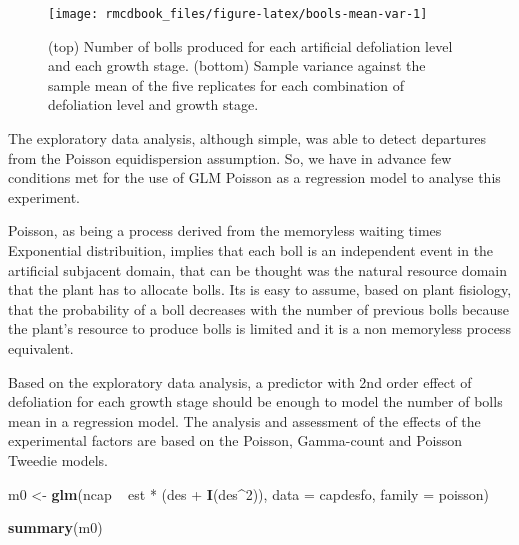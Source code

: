 \documentclass[9pt,a5paper,]{book}
\newenvironment{Shaded}{}{}
\newcommand{\KeywordTok}[1]{\textbf{{#1}}}
\newcommand{\DataTypeTok}[1]{\underline{{#1}}}
\newcommand{\DecValTok}[1]{{#1}}
\newcommand{\StringTok}[1]{{#1}}
\newcommand{\NormalTok}[1]{{#1}}
\renewenvironment{Shaded}{\color{inputcolor}}{}
\renewcommand{\DataTypeTok}[1]{{#1}}
\theoremstyle{definition}
\theoremstyle{definition}
\theoremstyle{remark}
\begin{document}
\begin{figure}[h]

{\centering \texttt{[image: rmcdbook\_files/figure-latex/bools-mean-var-1]} 

}

\caption{(top) Number of bolls produced for each artificial defoliation level and each growth stage. (bottom) Sample variance against the sample mean of the five replicates for each combination of defoliation level and growth stage.}\label{fig:bools-mean-var}
\end{figure}

The exploratory data analysis, although simple, was able to detect
departures from the Poisson equidispersion assumption. So, we have in
advance few conditions met for the use of GLM Poisson as a regression
model to analyse this experiment.

Poisson, as being a process derived from the memoryless waiting times
Exponential distribuition, implies that each boll is an independent
event in the artificial subjacent domain, that can be thought was the
natural resource domain that the plant has to allocate bolls. Its is
easy to assume, based on plant fisiology, that the probability of a boll
decreases with the number of previous bolls because the plant's resource
to produce bolls is limited and it is a non memoryless process
equivalent.

Based on the exploratory data analysis, a predictor with 2nd order
effect of defoliation for each growth stage should be enough to model
the number of bolls mean in a regression model. The analysis and
assessment of the effects of the experimental factors are based on the
Poisson, Gamma-count and Poisson Tweedie models.

\begin{Shaded}
\begin{Highlighting}[]
\NormalTok{m0 <-}\StringTok{ }\KeywordTok{glm}\NormalTok{(ncap ~}\StringTok{ }\NormalTok{est *}\StringTok{ }\NormalTok{(des +}\StringTok{ }\KeywordTok{I}\NormalTok{(des^}\DecValTok{2}\NormalTok{)),}
          \DataTypeTok{data =} \NormalTok{capdesfo,}
          \DataTypeTok{family =} \NormalTok{poisson)}

\KeywordTok{summary}\NormalTok{(m0)}
\end{Highlighting}
\end{Shaded}
\end{document}
